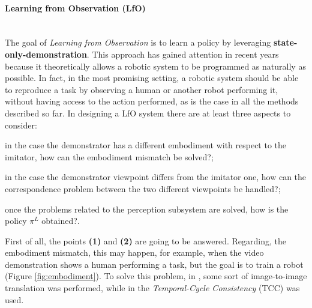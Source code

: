\paragraph{Learning from Observation (LfO)} \mbox{} \\
\label{sec:lfo}
The goal of \textit{Learning from Observation} is to learn a policy by leveraging \textbf{state-only-demonstration}. This approach has gained attention in recent years because it theoretically allows a robotic system to be programmed as naturally as possible. In fact, in the most promising setting, a robotic system should be able to reproduce a task by observing a human or another robot performing it, without having access to the action performed, as is the case in all the methods described so far. In designing a LfO system there are at least three aspects to consider: \begin{enumerate*}[label=\textbf{(\arabic*)}]
    \item in the case the demonstrator has a different embodiment with respect to the imitator, how can the embodiment mismatch be solved?;
    \item in the case the demonstrator viewpoint differs from the imitator one, how can the correspondence problem between the two different viewpoints be handled?;
    \item once the problems related to the perception subsystem are solved, how is the policy $\pi^{L}$ obtained?.
\end{enumerate*}

First of all, the points \textbf{(1)} and \textbf{(2)} are going to be answered. Regarding, the embodiment mismatch, this may happen, for example, when the video demonstration shows a human performing a task, but the goal is to train a robot (Figure \ref{fig:embodiment}).
To solve this problem, in \cite{smith2019avid,xiong2021learning_by_watching,li2021meta_watching_video_demonstration}, some sort of image-to-image translation was performed,  while in \cite{zakka2022xirl} the \textit{Temporal-Cycle Consistency} (TCC) \cite{dwibedi2019tcc} was used.
